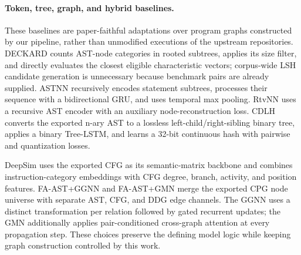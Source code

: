 \documentclass[authoryear,final,5p,times,twocolumn]{elsarticle}
\newcommand{\added}[1]{{\color{green!50!black}#1}}
\theoremstyle{plain}
\begin{document}
\paragraph{Token, tree, graph, and hybrid baselines.}
\added{These baselines are paper-faithful adaptations over program graphs
constructed by our pipeline, rather than unmodified executions of the upstream
repositories. DECKARD counts AST-node categories in rooted subtrees, applies its
size filter, and directly evaluates the closest eligible characteristic vectors;
corpus-wide LSH candidate generation is unnecessary because benchmark pairs are
already supplied. ASTNN recursively encodes statement subtrees, processes their
sequence with a bidirectional GRU, and uses temporal max pooling. RtvNN uses a
recursive AST encoder with an auxiliary node-reconstruction loss. CDLH converts
the exported n-ary AST to a lossless left-child/right-sibling binary tree, applies
a binary Tree-LSTM, and learns a 32-bit continuous hash with pairwise and
quantization losses.}

\added{DeepSim uses the exported CFG as its semantic-matrix backbone and combines
instruction-category embeddings with CFG degree, branch, activity, and position
features. FA-AST+GGNN and
FA-AST+GMN merge the exported CPG node universe with separate AST, CFG, and DDG
edge channels. The GGNN uses a distinct transformation per relation followed by
gated recurrent updates; the GMN additionally applies pair-conditioned
cross-graph attention at every propagation step. These choices preserve the
defining model logic while keeping graph construction controlled by this work.}
\end{document}
